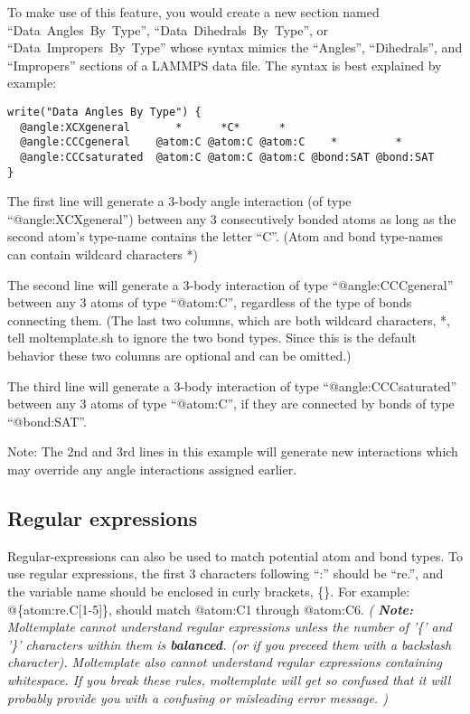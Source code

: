 \documentclass[11pt]{article}
\begin{document}
To make use of this feature, you would create a new section named
\mbox{``Data Angles By Type''}, \mbox{``Data Dihedrals By Type''}, 
or \mbox{``Data Impropers By Type''} 
whose syntax mimics the 
\mbox{``Angles''}, \mbox{``Dihedrals''}, and \mbox{``Impropers''} 
sections of a LAMMPS data file.
The syntax is best explained by example:

\begin{verbatim}
write("Data Angles By Type") {
  @angle:XCXgeneral       *      *C*      *
  @angle:CCCgeneral    @atom:C @atom:C @atom:C    *         *
  @angle:CCCsaturated  @atom:C @atom:C @atom:C @bond:SAT @bond:SAT
}
\end{verbatim}

The first line will generate a 3-body angle interaction 
(of type \mbox{``@angle:XCXgeneral''})
between any 3 consecutively bonded atoms 
as long as the second atom's type-name contains the letter ``C''.
(Atom and bond type-names can contain wildcard characters *)

The second line will generate a 3-body interaction 
of type \mbox{``@angle:CCCgeneral''}
between any 3 atoms of type \mbox{``@atom:C''},
regardless of the type of bonds connecting them.
(The last two columns, which are both wildcard characters, *, 
 tell moltemplate.sh to ignore the two bond types.
 Since this is the default behavior 
 these two columns are optional and can be omitted.)

The third line will generate a 3-body interaction of
type \mbox{``@angle:CCCsaturated''}
between any 3 atoms of type \mbox{``@atom:C''},
if they are connected by bonds of type \mbox{``@bond:SAT''}.

Note: The 2nd and 3rd lines in this example will generate new interactions 
which may override any angle interactions assigned earlier.

\subsection{Regular expressions}
\label{sec:regex}
Regular-expressions can also be used to match potential atom and bond types.
To use regular expressions, the first 3 characters following ``:'' should be
``re.'', and the variable name should be enclosed in curly brackets, \{\}.
For example: \mbox{@\{atom:re.C[1-5]\}}, should match 
\mbox{@atom:C1} through \mbox{@atom:C6}.
\textit{
(
\textbf{Note:}
Moltemplate cannot understand regular expressions unless the
number of '\{' and '\}' characters within them is \textbf{balanced}.
(or if you preceed them with a backslash character).
Moltemplate also cannot understand regular expressions containing whitespace.
If you break these rules, moltemplate will get so confused that it will
probably provide you with a confusing or misleading error message.
)
}
\end{document}
